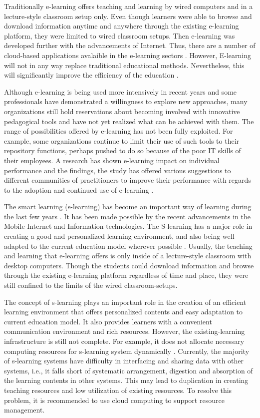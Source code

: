 \documentclass[journal]{vgtc}                %
\begin{document}
Traditionally e-learning offers teaching and learning by wired computers and in a lecture-style classroom setup only. Even though learners were able to browse and download information anytime and anywhere through the existing e-learning platform, they were limited to wired classroom setups. Then e-learning was developed further with the advancements of Internet. Thus, there are a number of cloud-based applications avalaible in the e-learning sectors \cite{s110807835}. However, E-learning will not in any way replace traditional educational methods. Nevertheless, this will significantly improve the efficiency of the education \cite{SudhirKumarSharmaNidhiGoyal2014}.

Although e-learning is being used more intensively in recent years and some professionals have demonstrated a willingness to explore new approaches, many organizations still hold reservations about becoming involved with innovative pedagogical tools and have not yet realized what can be achieved with them. The range of possibilities offered by e-learning has not been fully exploited. For example, some organizations continue to limit their use of such tools to their repository functions, perhaps pushed to do so because of the poor IT skills of their employees. A research has shown e-learning impact on individual performance and the findings, the study has offered various suggestions to different communities of practitioners to improve their performance with regards to the adoption and continued use of e-learning \cite{Mohammadyari2014}. 

The smart learning (s-learning) has become an important way of learning during the last few years \cite{Kim2013}. It has been made possible by the recent advancements in the Mobile Internet and Information technologies. The S-learning has a major role in creating a good and personalized learning environment, and also being well adapted to the current education model wherever possible \cite{Uden2007}. Usually, the teaching and learning that e-learning offers is only inside of a lecture-style classroom with desktop computers. Though the students could download information and browse through the existing e-learning platform regardless of time and place, they were still confined to the limits of the wired classroom-setups.

The concept of s-learning plays an important role in the creation of an efficient learning environment that offers personalized contents and easy adaptation to current education model. It also provides learners with a convenient communication environment and rich resources. However, the existing-learning infrastructure is still not complete. For example, it does not allocate necessary computing resources for s-learning system dynamically \cite{Kim2013}. Currently, the majority of s-learning systems have difficulty in interfacing and sharing data with other systems, i.e., it falls short of systematic arrangement, digestion and absorption of the learning contents in other systems. This may lead to duplication in creating teaching resources and low utilization of existing resources. To resolve this problem, it is recommended to use cloud computing to support resource management.
\end{document}

